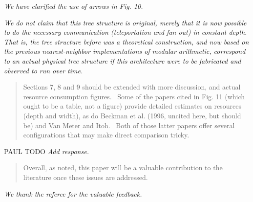\documentclass{article}
\theoremstyle{plain} \newtheorem{lemma}{Lemma}
\begin{document}
{\it We have clarified the use of arrows in Fig. 10.}

{\it We do not claim that this tree structure is original, merely that it is
now possible to do the necessary communication (teleportation and fan-out)
in constant depth. That is, the tree structure before was a theoretical
construction, and now based on the previous nearest-neighbor implementations
of modular arithmetic, correspond to an actual physical tree structure if
this architecture were to be fabricated and observed to run over time.}

\begin{quote}
Sections 7, 8 and 9 should be extended with more discussion, and
actual resource consumption figures.  Some of the papers cited in
Fig. 11 (which ought to be a table, not a figure) provide detailed
estimates on resources (depth and width), as do Beckman et al. (1996,
uncited here, but should be) and Van Meter and Itoh.  Both of those
latter papers offer several configurations that may make direct
comparison tricky.
\end{quote}

PAUL TODO
{\it Add response.}

\begin{quote}
Overall, as noted, this paper will be a valuable contribution to the
literature once these issues are addressed.
\end{quote}

{\it We thank the referee for the valuable feedback.}



\end{document}
